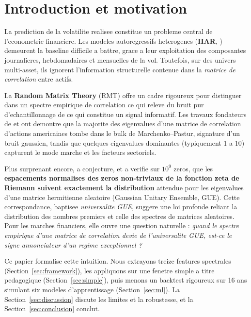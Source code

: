 \documentclass[11pt,a4paper]{article}
\begin{document}
\newpage
\tableofcontents
\newpage

\section{Introduction et motivation}

La prediction de la volatilite realisee constitue un probleme central de l'econometrie financiere. Les modeles autoregressifs heterogenes (\textbf{HAR}, \citealp{Corsi2009}) demeurent la baseline difficile a battre, grace a leur exploitation des composantes journalieres, hebdomadaires et mensuelles de la vol. Toutefois, sur des univers multi-asset, ils ignorent l'information structurelle contenue dans la \emph{matrice de correlation} entre actifs.

La \textbf{Random Matrix Theory} (RMT) offre un cadre rigoureux pour distinguer dans un spectre empirique de correlation ce qui releve du bruit pur d'echantillonnage de ce qui constitue un signal informatif. Les travaux fondateurs de \citet{Laloux1999} et \citet{Plerou2002} ont demontre que la majorite des eigenvalues d'une matrice de correlation d'actions americaines tombe dans le bulk de Marchenko--Pastur, signature d'un bruit gaussien, tandis que quelques eigenvalues dominantes (typiquement 1 a 10) capturent le mode marche et les facteurs sectoriels.

Plus surprenant encore, \citet{Montgomery1973} a conjecture, et \citet{Odlyzko1987} a verifie sur $10^9$ zeros, que les \textbf{espacements normalises des zeros non-triviaux de la fonction zeta de Riemann suivent exactement la distribution} attendue pour les eigenvalues d'une matrice hermitienne aleatoire (Gaussian Unitary Ensemble, GUE). Cette correspondance, baptisee \emph{universalite GUE}, suggere une loi profonde reliant la distribution des nombres premiers et celle des spectres de matrices aleatoires. Pour les marches financiers, elle ouvre une question naturelle : \emph{quand le spectre empirique d'une matrice de correlation devie de l'universalite GUE, est-ce le signe annonciateur d'un regime exceptionnel ?}

Ce papier formalise cette intuition. Nous extrayons treize features spectrales (Section~\ref{sec:framework}), les appliquons sur une fenetre simple a titre pedagogique (Section~\ref{sec:simple}), puis menons un backtest rigoureux sur 16 ans simulant six modeles d'apprentissage (Section~\ref{sec:ml}). La Section~\ref{sec:discussion} discute les limites et la robustesse, et la Section~\ref{sec:conclusion} conclut.
\end{document}
